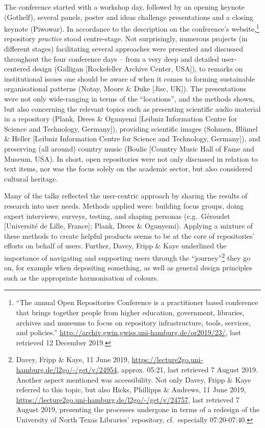 \documentclass[a4paper,
fontsize=11pt,
oneside,
numbers=noperiodatend,
parskip=half-,
bibliography=totoc,
final
]{scrartcl}
\begin{document}
The conference started with a workshop day, followed by an opening
keynote (Gothelf), several panels, poster and ideas challenge
presentations and a closing keynote (Piwowar). In accordance to the
description on the conference's website,\footnote{\enquote{The annual
  Open Repositories Conference is a practitioner based conference that
  brings together people from higher education, government, libraries,
  archives and museums to focus on repository infrastructure, tools,
  services, and policies.}
  \url{http://archiv.gwin.gwiss.uni-hamburg.de/or2019/23/}, last
  retrieved 12 December 2019.} repository \emph{practice} stood
centre-stage. Not surprisingly, numerous projects (in different stages)
facilitating several approaches were presented and discussed throughout
the four conference days -- from a very deep and detailed user-centered
design (Galligan {[}Rockefeller Archive Center, USA{]}), to remarks on
institutional issues one should be aware of when it comes to forming
sustainable organisational patterns (Notay, Moore \& Duke {[}Jisc,
UK{]}). The presentations were not only wide-ranging in terms of the
\enquote{locations}, and the methods shown, but also concerning the
relevant topics such as presenting scientific audio material in a
repository (Plank, Drees \& Ogunyemi {[}Leibniz Information Centre for
Science and Technology, Germany{]}), providing scientific images
(Sohmen, Blümel \& Heller {[}Leibniz Information Centre for Science and
Technology, Germany{]}), and preserving (all around) country music
(Boulie {[}Country Music Hall of Fame and Museum, USA). In short, open
repositories were not only discussed in relation to text items, nor was
the focus solely on the academic sector, but also considered cultural
heritage.

Many of the talks reflected the user-centric approach by sharing the
results of research into user needs. Methods applied were: building
focus groups, doing expert interviews, surveys, testing, and shaping
personas (e.g.~Géroudet {[}Université de Lille, France{]}; Plank, Drees
\& Ogunyemi). Applying a mixture of these methods to create helpful
products seems to be at the core of repositories' efforts on behalf of
users. Further, Davey, Fripp \& Kaye underlined the importance of
navigating and supporting users through the \enquote{journey}\footnote{Davey,
  Fripp \& Kaye, 11 June 2019,
  \url{https://lecture2go.uni-hamburg.de/l2go/-/get/v/24954}, approx.
  05:21, last retrieved 7 August 2019. Another aspect mentioned was
  accessibility. Not only Davey, Fripp \& Kaye referred to this topic,
  but also Hicks, Phillipps \& Andrews, 11 June 2019,
  \url{https://lecture2go.uni-hamburg.de/l2go/-/get/v/24757}, last
  retrieved 7 August 2019, presenting the processes undergone in terms
  of a redesign of the University of North Texas Libraries' repository,
  cf.~especially 07:20-07:40.} they go on, for example when depositing
something, as well as general design principles such as the appropriate
harmonisation of colours.
\end{document}
